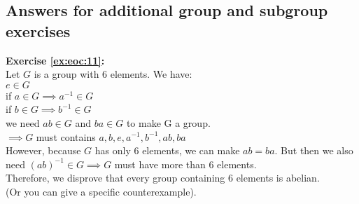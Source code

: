 \subsection{Answers for additional group and subgroup exercises}
\textbf{Exercise \ref{ex:eoc:11}:}\\
Let $G$ is a group with 6 elements. We have:\\
$e\in G$\\
if $a\in G\implies a^{-1}\in G$\\
if $b\in G\implies b^{-1}\in G$\\
we need $ab\in G$ and $ba\in G$ to make G a group.\\
$\implies G$ must contains $a,b,e,a^{-1},b^{-1},ab,ba$\\
However, because $G$ has only 6 elements, we can make $ab=ba$. But then we also need $(ab)^{-1}\in G\implies G$ must have more than 6 elements.\\
Therefore, we disprove that every group containing 6 elements is abelian.\\
(Or you can give a specific counterexample).\\
